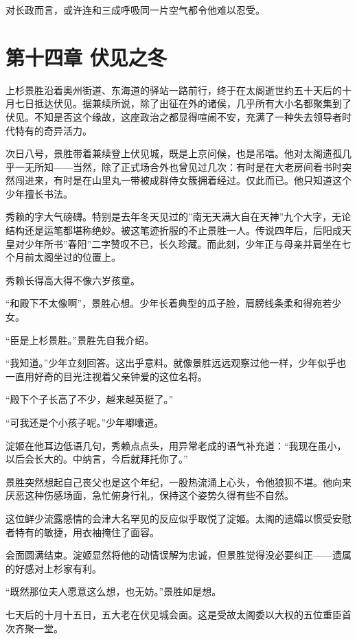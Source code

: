 \documentclass[
]{article}
\begin{document}
对长政而言，或许连和三成呼吸同一片空气都令他难以忍受。

\section*{第十四章 伏见之冬}\label{ux7b2cux5341ux56dbux7ae0-ux4f0fux89c1ux4e4bux51ac}

上杉景胜沿着奥州街道、东海道的驿站一路前行，终于在太阁逝世约五十天后的十月七日抵达伏见。据兼续所说，除了出征在外的诸侯，几乎所有大小名都聚集到了伏见。不知是否这个缘故，这座政治之都显得喧闹不安，充满了一种失去领导者时代特有的奇异活力。

次日八号，景胜带着兼续登上伏见城，既是上京问候，也是吊唁。他对太阁遗孤几乎一无所知------当然，除了正式场合外也曾见过几次：有时是在大老房间看书时突然闯进来，有时是在山里丸一带被成群侍女簇拥着经过。仅此而已。他只知道这个少年擅长书法。

秀赖的字大气磅礴。特别是去年冬天见过的''南无天满大自在天神''九个大字，无论结构还是运笔都堪称绝妙。被这笔迹折服的不止景胜一人。传说四年后，后阳成天皇对少年所书''春阳''二字赞叹不已，长久珍藏。而此刻，少年正与母亲并肩坐在七个月前太阁坐过的位置上。

秀赖长得高大得不像六岁孩童。

``和殿下不太像啊''，景胜心想。少年长着典型的瓜子脸，肩膀线条柔和得宛若少女。

``臣是上杉景胜。''景胜先自我介绍。

``我知道。''少年立刻回答。这出乎意料。就像景胜远远观察过他一样，少年似乎也一直用好奇的目光注视着父亲钟爱的这位名将。

``殿下个子长高了不少，越来越英挺了。''

``可我还是个小孩子呢。''少年嘟囔道。

淀姬在他耳边低语几句，秀赖点点头，用异常老成的语气补充道：``我现在虽小，以后会长大的。中纳言，今后就拜托你了。''

景胜突然想起自己丧父也是这个年纪，一股热流涌上心头，令他狼狈不堪。他向来厌恶这种伤感场面，急忙俯身行礼，保持这个姿势久得有些不自然。

这位鲜少流露感情的会津大名罕见的反应似乎取悦了淀姬。太阁的遗孀以惯受安慰者特有的敏捷，用衣袖掩住了面容。

会面圆满结束。淀姬显然将他的动情误解为忠诚，但景胜觉得没必要纠正------遗属的好感对上杉家有利。

``既然那位夫人愿意这么想，也无妨。''景胜如是想。

七天后的十月十五日，五大老在伏见城会面。这是受故太阁委以大权的五位重臣首次齐聚一堂。
\end{document}
